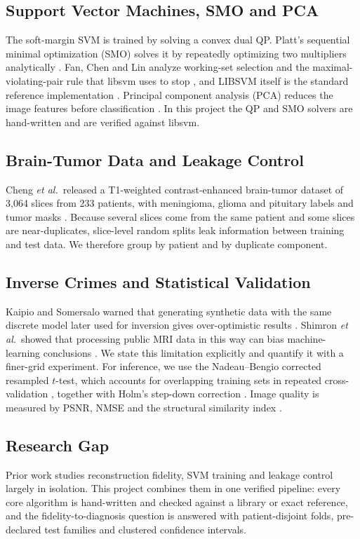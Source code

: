 \documentclass[conference,a4paper]{IEEEtran}
\newcommand{\etal}{\textit{et al.}}
\begin{document}
\subsection{Support Vector Machines, SMO and PCA}
The soft-margin SVM \cite{cortes} is trained by solving a convex dual QP. Platt's sequential minimal optimization (SMO) solves it by repeatedly optimizing two multipliers analytically \cite{platt}. Fan, Chen and Lin analyze working-set selection and the maximal-violating-pair rule that libsvm uses to stop \cite{fan}, and LIBSVM itself is the standard reference implementation \cite{libsvm}. Principal component analysis (PCA) reduces the image features before classification \cite{jolliffe}. In this project the QP and SMO solvers are hand-written and are verified against libsvm.

\subsection{Brain-Tumor Data and Leakage Control}
Cheng \etal\ released a T1-weighted contrast-enhanced brain-tumor dataset of 3{,}064 slices from 233 patients, with meningioma, glioma and pituitary labels and tumor masks \cite{cheng}. Because several slices come from the same patient and some slices are near-duplicates, slice-level random splits leak information between training and test data. We therefore group by patient and by duplicate component.

\subsection{Inverse Crimes and Statistical Validation}
Kaipio and Somersalo warned that generating synthetic data with the same discrete model later used for inversion gives over-optimistic results \cite{kaipio}. Shimron \etal\ showed that processing public MRI data in this way can bias machine-learning conclusions \cite{shimron}. We state this limitation explicitly and quantify it with a finer-grid experiment. For inference, we use the Nadeau--Bengio corrected resampled $t$-test, which accounts for overlapping training sets in repeated cross-validation \cite{nadeau}, together with Holm's step-down correction \cite{holm}. Image quality is measured by PSNR, NMSE and the structural similarity index \cite{wang}.

\subsection{Research Gap}
Prior work studies reconstruction fidelity, SVM training and leakage control largely in isolation. This project combines them in one verified pipeline: every core algorithm is hand-written and checked against a library or exact reference, and the fidelity-to-diagnosis question is answered with patient-disjoint folds, pre-declared test families and clustered confidence intervals.
\end{document}
